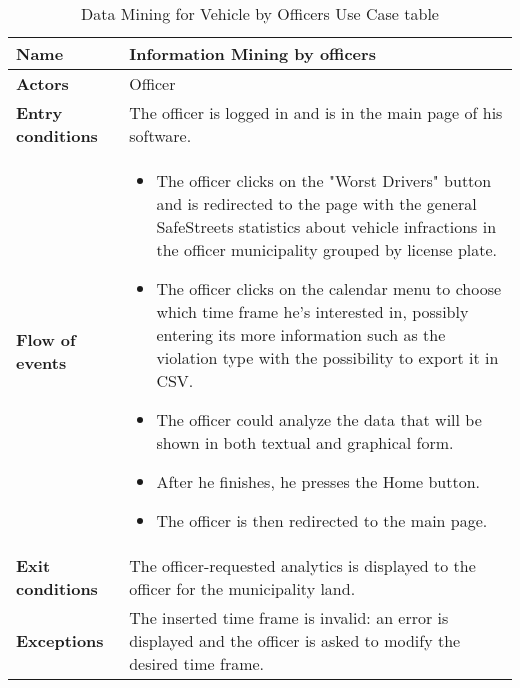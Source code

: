 \begin{table}[!htbp]
	\hypertarget{tab:dataminingvehicleofficerstab}{}
	\centering
	\begin{tabular}{lp{9cm}}
		\bf\large Name&\bf\large Information Mining by officers\\
		\hline
		\hline
		\bf Actors&Officer\\
		\hline
		\bf Entry conditions&The officer is logged in and is in the main page of his software.\\
		\hline
		\bf Flow of events&
		\begin{itemize}
			
			\item The officer clicks on the "Worst Drivers" button and is redirected to the page with the general SafeStreets statistics about vehicle infractions in the officer municipality grouped by license plate.
			
			\item The officer clicks on the calendar menu to choose which time frame he's interested in, possibly entering its more information such as the violation type with the possibility to export it in CSV.
			
			\item The officer could analyze the data that will be shown in both textual and graphical form.
			
			\item After he finishes, he presses the Home button.
			
			\item The officer is then redirected to the main page.
			
		\end{itemize}
		\\
		\hline
		\bf Exit conditions&The officer-requested analytics is displayed to the officer for the municipality land.\\
		\hline
		\bf Exceptions&The inserted time frame is invalid: an error is displayed and the officer is asked to modify the desired time frame.
		\\
		\hline
		
	\end{tabular}
	\caption{Data Mining for Vehicle by Officers Use Case table}
	\label{tab:dataminingvehicleofficerstab}
\end{table}